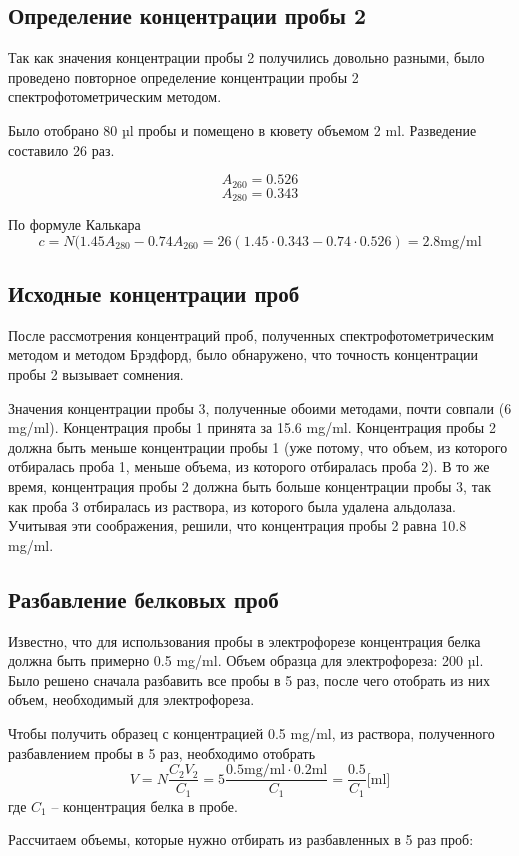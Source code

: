 \subsection{Определение концентрации пробы 2}
Так как значения концентрации пробы 2 получились довольно разными,
было проведено повторное определение концентрации пробы 2 спектрофотометрическим методом.

Было отобрано 80 µl пробы и помещено в кювету объемом 2 ml.
Разведение составило 26 раз.

$$ A_{260} = 0.526 $$
$$ A_{280} = 0.343 $$

По формуле Калькара
$$ c = N (1.45 A_{280} - 0.74 A_{260} = 26 (1.45 \cdot 0.343 - 0.74 \cdot 0.526) = 2.8 \text{mg/ml}$$

\subsection{Исходные концентрации проб}
После рассмотрения концентраций проб, полученных спектрофотометрическим методом
и методом Брэдфорд, было обнаружено, что точность концентрации пробы 2 вызывает
сомнения.

Значения концентрации пробы 3, полученные обоими методами, почти совпали (6 mg/ml).
Концентрация пробы 1 принята за 15.6 mg/ml.
Концентрация пробы 2 должна быть меньше концентрации пробы 1
(уже потому, что объем, из которого отбиралась проба 1,
меньше объема, из которого отбиралась проба 2).
В то же время, концентрация пробы 2 должна быть больше концентрации пробы 3,
так как проба 3 отбиралась из раствора, из которого была удалена альдолаза.
Учитывая эти соображения, решили, что концентрация пробы 2 равна 10.8 mg/ml.

\subsection{Разбавление белковых проб}
Известно, что для использования пробы в электрофорезе концентрация
белка должна быть примерно 0.5 mg/ml.
Объем образца для электрофореза: 200 µl.
Было решено сначала разбавить все пробы в 5 раз, после чего
отобрать из них объем, необходимый для электрофореза.

Чтобы получить образец с концентрацией 0.5 mg/ml,
из раствора, полученного разбавлением пробы в 5 раз,
необходимо отобрать
$$ V = N \frac{C_2 V_2}{C_1} = 5 \frac{0.5 \text{mg/ml} \cdot 0.2 \text{ml}}{C_1} = \frac{0.5}{C_1} \text{[ml]} $$
где $C_1$ -- концентрация белка в пробе.

Рассчитаем объемы, которые нужно отбирать из разбавленных в 5 раз проб:

